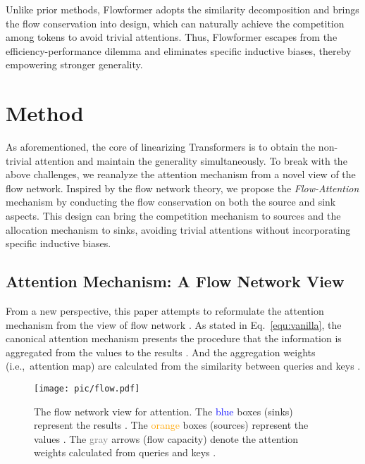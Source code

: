 \documentclass[nohyperref]{article}
\theoremstyle{plain}
\theoremstyle{definition}
\theoremstyle{remark}
\begin{document}
Unlike prior methods, Flowformer adopts the similarity decomposition and brings the flow conservation into design, which can naturally achieve the competition among tokens to avoid trivial attentions. Thus, Flowformer escapes from the efficiency-performance dilemma and eliminates specific inductive biases, thereby empowering stronger generality.


\section{Method}

As aforementioned, the core of linearizing Transformers is to obtain the non-trivial attention and maintain the generality simultaneously. To break with the above challenges, we reanalyze the attention mechanism from a novel view of the flow network. Inspired by the flow network theory, we propose the \emph{Flow-Attention} mechanism by conducting the flow conservation on both the source and sink aspects. This design can bring the competition mechanism to sources and the allocation mechanism to sinks, avoiding trivial attentions without incorporating specific inductive biases.

\subsection{Attention Mechanism: A Flow Network View}

From a new perspective, this paper attempts to reformulate the attention mechanism from the view of flow network \cite{Ahuja1993NetworkF}. As stated in Eq.~\eqref{equ:vanilla}, the canonical attention mechanism presents the procedure that the information is aggregated from the values  to the results . And the aggregation weights (i.e.,~attention map) are calculated from the similarity between queries  and keys . 

\begin{figure}[h]
    \begin{center}
    \centerline{\texttt{[image: pic/flow.pdf]}}
    \vspace{-5pt}
    \caption{The flow network view for attention. The \textcolor{blue}{blue} boxes (sinks) represent the results . The \textcolor{orange}{orange} boxes (sources) represent the values . The \textcolor{gray}{gray} arrows (flow capacity) denote the attention weights calculated from queries  and keys .}
    \label{fig:flow-view}
    \end{center}
    \vspace{-15pt}
\end{figure}
\end{document}

